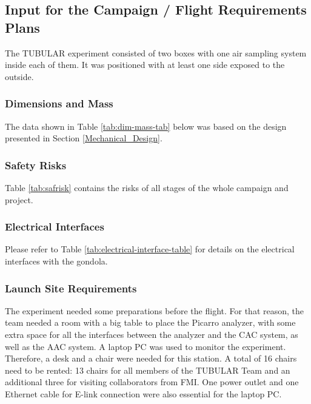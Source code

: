 \subsection{Input for the Campaign / Flight Requirements Plans}

The TUBULAR experiment consisted of two boxes with one air sampling system inside each of them. It was positioned with at least one side exposed to the outside.

\subsubsection{Dimensions and Mass}
\label{sec:dim-mass}

The data shown in Table \ref{tab:dim-mass-tab} below was based on the design presented in Section \ref{Mechanical_Design}.   



\subsubsection{Safety Risks}
Table \ref{tab:safrisk} contains the risks of all stages of the whole campaign and project.


\subsubsection{Electrical Interfaces}

Please refer to Table \ref{tab:electrical-interface-table} for details on the electrical interfaces with the gondola.



\subsubsection{Launch Site Requirements}
The experiment needed some preparations before the flight. For that reason, the team needed a room with a big table to place the Picarro analyzer, with some extra space for all the interfaces between the analyzer and the CAC system, as well as the AAC system.
A laptop PC was used to monitor the experiment. Therefore, a desk and a chair were needed for this station. A total of 16 chairs need to be rented: 13 chairs for all members of the TUBULAR Team and an additional three for visiting collaborators from FMI. One power outlet and one Ethernet cable for E-link connection were also essential for the laptop PC.

